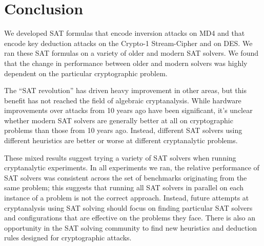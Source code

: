 \section{Conclusion}
\label{sec:conclusion}
We developed SAT formulas that encode inversion attacks on MD4 and that encode key deduction attacks on the Crypto-1 Stream-Cipher and on DES. We ran these SAT formulas on a variety of older and modern SAT solvers. We found that the change in performance between older and modern solvers was highly dependent on the particular cryptographic problem.

The ``SAT revolution'' has driven heavy improvement in other areas, but this benefit has not reached the field of algebraic cryptanalysis. While hardware improvements over attacks from 10 years ago have been significant, it's unclear whether modern SAT solvers are generally better at all on cryptographic problems than those from 10 years ago. Instead, different SAT solvers using different heuristics are better or worse at different cryptanalytic problems.

These mixed results suggest trying a variety of SAT solvers when running cryptanalytic experiments. In all experiments we ran, the relative performance of SAT solvers was consistent across the set of benchmarks originating from the same problem; this suggests that running all SAT solvers in parallel on each instance of a problem is not the correct approach. Instead, future attempts at cryptanalysis using SAT solving should focus on finding particular SAT solvers and configurations that are effective on the problems they face. There is also an opportunity in the SAT solving community to find new heuristics and deduction rules designed for cryptographic attacks.